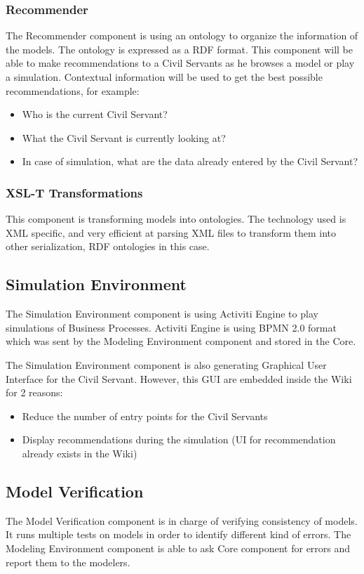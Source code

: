 \documentclass{learnpad}
\begin{document}
\subsubsection{Recommender}
The Recommender component is using an ontology to organize the information of
the models.  The ontology is expressed as a RDF format.  This component will be
able to make recommendations to a Civil Servants as he browses a model or play a
simulation.  Contextual information will be used to get the best possible
recommendations, for example:
\begin{itemize}
	\item Who is the current Civil Servant?
	\item What the Civil Servant is currently looking at?
	\item In case of simulation, what are the data already entered by the Civil
		Servant?
\end{itemize}

\subsubsection{XSL-T Transformations}
This component is transforming models into ontologies.  The technology used is
XML specific, and very efficient at parsing XML files to transform them into
other serialization, RDF ontologies in this case.

\subsection{Simulation Environment}
The Simulation Environment component is using Activiti Engine to play
simulations of Business Processes.  Activiti Engine is using BPMN 2.0 format
which was sent by the Modeling Environment component and stored in the \learnpad
Core.

The Simulation Environment component is also generating Graphical User Interface
for the Civil Servant.  However, this GUI are embedded inside the Wiki for 2
reasons:
\begin{itemize}
	\item Reduce the number of entry points for the Civil Servants
	\item Display recommendations during the simulation (UI for recommendation
		already exists in the Wiki)
\end{itemize}

\subsection{Model Verification}
The Model Verification component is in charge of verifying consistency of
models.  It runs multiple tests on models in order to identify different kind of
errors.  The Modeling Environment component is able to ask \learnpad Core
component for errors and report them to the modelers.
\end{document}

